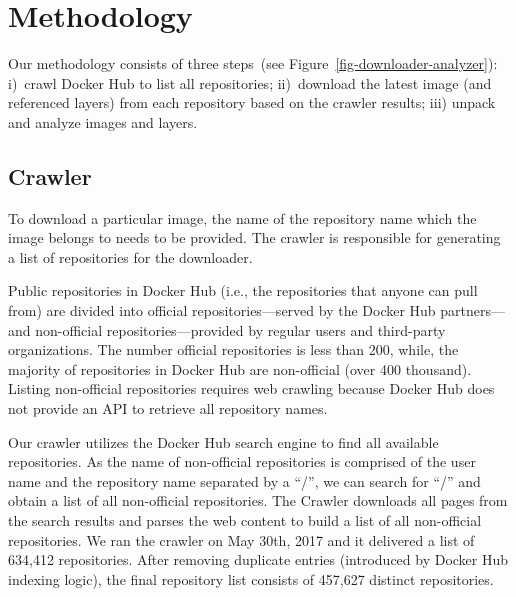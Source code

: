 \section{Methodology}
\label{sec:methodology}


Our methodology consists of three steps~(see Figure~\ref{fig-downloader-analyzer}):
i)~crawl Docker Hub to list all repositories;
ii)~download the latest image (and referenced layers) from each repository based
on the crawler results; iii) unpack and analyze images and layers.



\subsection{Crawler}
\label{sec:crawler}


To download a particular image, %
the name of the repository name which the image belongs to needs to be provided.
The crawler is responsible for generating a list of repositories for the downloader.

Public repositories 
in Docker Hub
(i.e., the repositories
that anyone can pull from)
are divided into official
repositories---served by the Docker Hub partners---and non-official
repositories---provided by regular users and third-party organizations.
%
The number official repositories is less than 200, while, the majority
of repositories in Docker Hub are non-official (over 400 thousand).
Listing non-official repositories requires web crawling because
Docker Hub does not provide an API to retrieve all repository names.

Our crawler utilizes the Docker Hub search engine to find all available
repositories.
%
As the name of non-official repositories is comprised
of the user name and the repository name separated by a ``/'', %
we can search for ``/'' and obtain a list of all non-official repositories.
The Crawler downloads all pages from the search results and parses the web content
to build a list of all non-official repositories.
We ran the crawler on May 30th, 2017 and it delivered a list of 634,412 repositories.
%
%
After removing duplicate entries (introduced by Docker Hub indexing logic),
the final repository list consists of 457,627
distinct repositories. 

